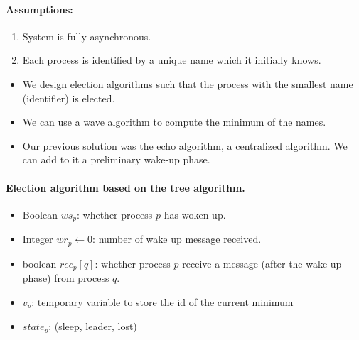 \paragraph{Assumptions:}
\begin{enumerate}
\item System is fully asynchronous.
\item Each process is identified by a unique name which it initially knows.
\end{enumerate}

\begin{itemize}
\item We design election algorithms such that the process with the smallest name (identifier) is elected.
\item We can use a wave algorithm to compute the minimum of the names.
\item Our previous solution was the echo algorithm, a centralized algorithm. We can add to it a preliminary wake-up phase.
\end{itemize}


\paragraph{Election algorithm based on the tree algorithm.}
\begin{itemize}
\item Boolean $ws_p$: whether process $p$ has woken up.
\item Integer $wr_p \leftarrow 0$: number of wake up message received.
\item boolean $rec_p[q]$: whether process $p$ receive a message (after the wake-up phase) from process $q$.
\item $v_p$: temporary variable to store the id of the current minimum
\item $state_p$: (sleep, leader, lost)
\end{itemize}


